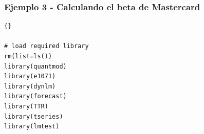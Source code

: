 \subsubsection{\textbf{Ejemplo 3 - Calculando el beta de Mastercard } }
	
%	
%			
%			
%	
\begin{lstlisting}[title={‘Código R: Packages requeridos },basicstyle=\ttfamily]{}

# load required library
rm(list=ls())
library(quantmod)
library(e1071)
library(dynlm)
library(forecast)
library(TTR)
library(tseries)
library(lmtest)
\end{lstlisting}

